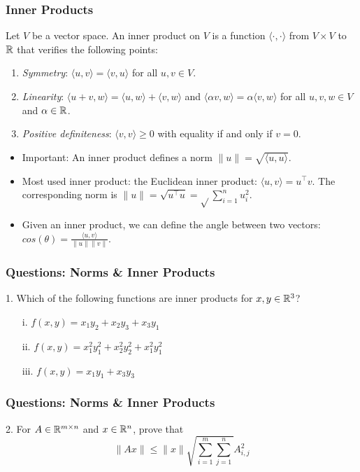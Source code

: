 \documentclass{beamer}
\begin{document}
\begin{frame}[t]
\frametitle{Inner Products}
\begin{definition}
	Let $V$ be a vector space.
	An inner product on $V$ is a function $\langle \cdot, \cdot \rangle$ from $V \times V$ to $\mathbb{R}$ that verifies the following points:
	\begin{enumerate}
		\item \emph{Symmetry}: $\langle u, v \rangle = \langle v, u\rangle$ for all $u,v \in V$.
		\item \emph{Linearity}: $\langle u+v, w \rangle = \langle u, w\rangle + \langle v, w\rangle$ and $\langle \alpha v, w \rangle = \alpha \langle v, w \rangle$ for all $u,v,w \in V$ and $\alpha \in \mathbb{R}$.
		\item \emph{Positive definiteness}: $\langle v, v\rangle \geq 0$ with equality if and only if $v = 0$.
\end{enumerate}
\end{definition}
\begin{itemize}
\item Important: An inner product defines a norm $\|u\| = \sqrt{\langle u, u \rangle}$.
\item Most used inner product: the Euclidean inner product: $\langle u,v \rangle = u^\top v$. The corresponding norm is $\|u\|= \sqrt{u^\top u} = \sqrt{}\sum_{i=1}^n u_i^2$.
\item Given an inner product, we can define the angle between two vectors: $cos(\theta) = \frac{ \langle u,v \rangle }{\|u\| \|v\|}$.
\end{itemize}
\end{frame}

\begin{frame}[t]
\frametitle{Questions: Norms \& Inner Products}
1. Which of the following functions are inner products for $x,y\in\mathbb{R}^3$?
\begin{enumerate}
\item[i.] $f(x,y) = x_1y_2+x_2y_3+x_3y_1$
\item[ii.] $f(x,y) = x_1^2y_1^2+x_2^2y_2^2+x_1^2y_1^2$
\item[iii.] $f(x,y) = x_1y_1+x_3y_3$
\end{enumerate}
\pause
\pause
\end{frame}

\begin{frame}[t]
\frametitle{Questions: Norms \& Inner Products}
2. For $A \in \mathbb{R}^{m\times n}$ and $x\in \mathbb{R}^n$, prove that
$$ \|Ax\| \leq \|x\|\sqrt{\sum_{i=1}^m \sum_{j=1}^n} A_{i,j}^2$$
\pause
\end{frame}
\end{document}

